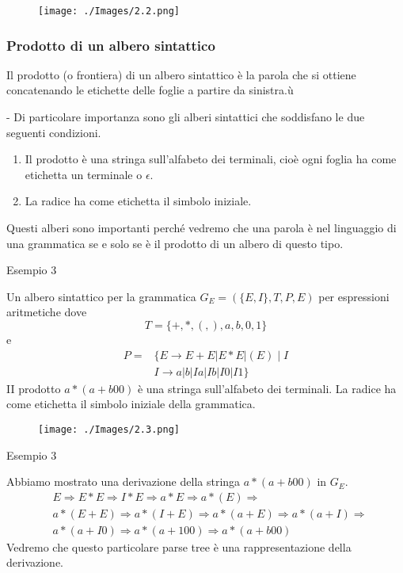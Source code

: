 \begin{figure}[hbpt!]
    \centering
    \texttt{[image: ./Images/2.2.png]}
\end{figure}
\FloatBarrier

\subsubsection{Prodotto di un albero sintattico}
Il prodotto (o frontiera) di un albero sintattico è la parola che si ottiene concatenando le etichette delle foglie a partire da sinistra.ù

- Di particolare importanza sono gli alberi sintattici che soddisfano le due seguenti condizioni.
\begin{enumerate}
    \item Il prodotto è una stringa sull'alfabeto dei terminali, cioè ogni foglia ha come etichetta un terminale o $\epsilon$.
    \item La radice ha come etichetta il simbolo iniziale.
\end{enumerate}
Questi alberi sono importanti perché vedremo che una parola è nel linguaggio di una grammatica se e solo se è il prodotto di un albero di questo tipo.

\vspace{5mm}

Esempio 3

Un albero sintattico per la grammatica $G_{E}=(\{E, I\}, T, P, E)$ per espressioni aritmetiche dove
$$
T=\{+, *,(,), a, b, 0,1\}
$$
e
$$
\begin{aligned}
P=&\{E \rightarrow E+E|E * E|(E) \mid I\\
&I \rightarrow a|b| Ia| Ib| I0 | I1\}
\end{aligned}
$$
II prodotto $a *(a+b 00)$ è una stringa sull'alfabeto dei terminali. La radice ha come etichetta il simbolo iniziale della grammatica.

\begin{figure}[hbpt!]
    \centering
    \texttt{[image: ./Images/2.3.png]}
\end{figure}
\FloatBarrier

Esempio 3

Abbiamo mostrato una derivazione della stringa $a *(a+b 00)$ in $G_{E}$.
$$
\begin{aligned}
&E \Rightarrow E * E \Rightarrow I * E \Rightarrow a * E \Rightarrow a *(E) \Rightarrow \\
&a *(E+E) \Rightarrow a *(I+E) \Rightarrow a *(a+E) \Rightarrow a *(a+I) \Rightarrow \\
&a *(a+I 0) \Rightarrow a *(a+100) \Rightarrow a *(a+b 00)
\end{aligned}
$$
Vedremo che questo particolare parse tree è una rappresentazione della derivazione.

